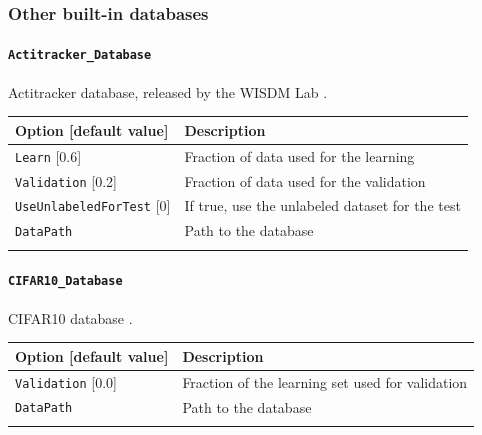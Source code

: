 \documentclass[a4paper,11pt,oneside]{article}
\begin{document}
\subsubsection{Other built-in databases}

\paragraph{\texorpdfstring{%
\lstinline[basicstyle=\ttfamily\bfseries]!Actitracker_Database!}{Actitracker\_Database}}
Actitracker database, released by the WISDM Lab \citep{Lockhart2011}.

\begin{center}
 \begin{tabular}{| p{5cm} | p{10cm} | }
 \hline
 Option [default value] & Description\\
 \hline\hline
  \lstinline!Learn! [0.6] & Fraction of data used for the learning \\
  \lstinline!Validation! [0.2] & Fraction of data used for the validation \\
  \lstinline!UseUnlabeledForTest! [0] & If true, use the unlabeled dataset for the test \\
  \lstinline!DataPath! & Path to the database \\
   & \\
 \hline
\end{tabular}
\end{center}


\paragraph{\texorpdfstring{%
\lstinline[basicstyle=\ttfamily\bfseries]!CIFAR10_Database!}{CIFAR10\_Database}}
CIFAR10 database \citep{Krizhevsky2009}.

\begin{center}
 \begin{tabular}{| p{5cm} | p{10cm} | }
 \hline
 Option [default value] & Description\\
 \hline\hline
  \lstinline!Validation! [0.0] & Fraction of the learning set used for
  validation \\
  \lstinline!DataPath! & Path to the database \\
  \noindent [\lstinline!$N2D2_DATA!/cifar-10-batches-bin] & \\
 \hline
\end{tabular}
\end{center}
\end{document}
